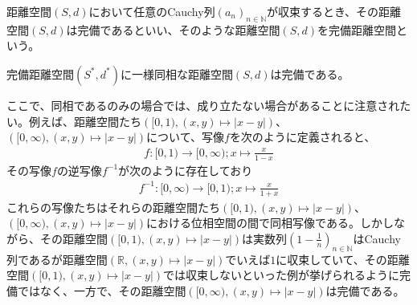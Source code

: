 \documentclass[dvipdfmx]{jsarticle}
\begin{document}
\begin{dfn}
距離空間$(S,d)$において任意のCauchy列$\left( a_{n} \right)_{n \in \mathbb{N}}$が収束するとき、その距離空間$(S,d)$は完備であるといい、そのような距離空間$(S,d)$を完備距離空間という。
\end{dfn}
\begin{thm}\label{8.2.4.8}
完備距離空間$\left( S^{*},d^{*} \right)$に一様同相な距離空間$(S,d)$は完備である。
\end{thm}\par
ここで、同相であるのみの場合では、成り立たない場合があることに注意されたい。例えば、距離空間たち$\left([0,1),\left( x,y\right) \mapsto \left| x - y \right| \right)$、$\left([0,\infty ),\left( x,y\right) \mapsto \left| x - y \right| \right)$について、写像$f$を次のように定義されると、
\begin{align*}
f:[0,1) \rightarrow [0,\infty) ;x\mapsto \frac{x}{1 - x} 
\end{align*}
その写像$f$の逆写像$f^{-1}$が次のように存在しており
\begin{align*}
f^{-1}:[0,\infty ) \rightarrow [0,1) ;x\mapsto \frac{x}{1 + x} 
\end{align*}
これらの写像たちはそれらの距離空間たち$\left([0,1),\left( x,y\right) \mapsto \left| x - y \right| \right)$、$\left([0,\infty ),\left( x,y\right) \mapsto \left| x - y \right| \right)$における位相空間の間で同相写像である。しかしながら、その距離空間$\left([0,1),\left( x,y\right) \mapsto \left| x - y \right| \right)$は実数列$\left( 1-\frac{1}{n} \right)_{n\in \mathbb{N}}$はCauchy列であるが距離空間$\left(\mathbb{R},\left( x,y\right) \mapsto \left| x - y \right| \right)$でいえば$1$に収束していて、その距離空間$\left([0,1),\left( x,y\right) \mapsto \left| x - y \right| \right)$では収束しないといった例が挙げられるように完備ではなく、一方で、その距離空間$\left([0,\infty ),\left( x,y\right) \mapsto \left| x - y \right| \right)$は完備である。
\end{document}
